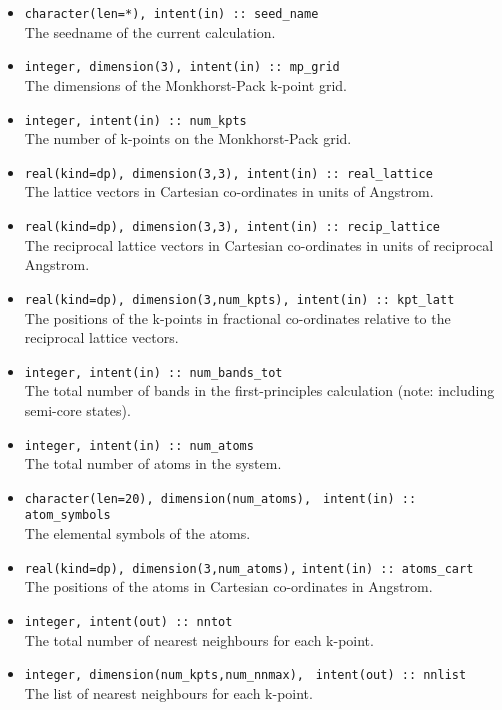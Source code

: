 \begin{itemize}
\item \verb#character(len=*), intent(in) :: seed_name#\\ The seedname
  of the current calculation.
\item \verb#integer, dimension(3), intent(in) :: mp_grid#\\ The
  dimensions of the {Monkhorst-Pack} k-point grid.
\item \verb#integer, intent(in) :: num_kpts#\\ The number of k-points on
  the {Monkhorst-Pack} grid.
\item \verb#real(kind=dp), dimension(3,3), intent(in) :: real_lattice#\\
  The lattice vectors in Cartesian co-ordinates in units of Angstrom.
\item \verb#real(kind=dp), dimension(3,3), intent(in) :: recip_lattice#\\
  The reciprocal lattice vectors in Cartesian co-ordinates in units of reciprocal Angstrom.
\item
  \verb#real(kind=dp), dimension(3,num_kpts), intent(in) :: kpt_latt#\\
  The positions of the k-points in fractional co-ordinates
  relative to the reciprocal lattice vectors.
\item \verb#integer, intent(in) :: num_bands_tot#\\ The total number of bands in the
first-principles calculation (note: including semi-core states).
\item \verb#integer, intent(in) :: num_atoms#\\ The total number of atoms
  in the system.
\item \verb#character(len=20), dimension(num_atoms),#
      \verb# intent(in) :: atom_symbols#\\ The elemental symbols of
      the atoms.
\item \verb#real(kind=dp), dimension(3,num_atoms),#
      \verb#intent(in) :: atoms_cart#\\ The positions of the atoms in
      Cartesian co-ordinates in Angstrom.
\item \verb#integer, intent(out) :: nntot#\\ The
  total number of nearest neighbours for each k-point. 
\item \verb#integer, dimension(num_kpts,num_nnmax),#
      \verb# intent(out) :: nnlist#\\
      The list of nearest neighbours for each k-point.

\end{itemize}
